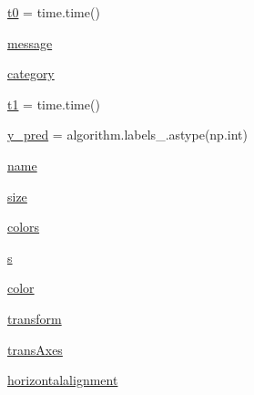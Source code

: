 \begin{DoxyCompactItemize}
\item 
\hyperlink{namespaceStreamClusteringAlgorithms_1_1evoStream_1_1v1_1_1Tests_1_1plot__cluster__comparison2_ac0dd76c5ba016809d5a00a239a231dc4}{t0} = time.\+time()
\item 
\hyperlink{namespaceStreamClusteringAlgorithms_1_1evoStream_1_1v1_1_1Tests_1_1plot__cluster__comparison2_ae7d4af8c5bedcefff2785458eff86e66}{message}
\item 
\hyperlink{namespaceStreamClusteringAlgorithms_1_1evoStream_1_1v1_1_1Tests_1_1plot__cluster__comparison2_a5ada10fda3ccf53faa672704f11e469b}{category}
\item 
\hyperlink{namespaceStreamClusteringAlgorithms_1_1evoStream_1_1v1_1_1Tests_1_1plot__cluster__comparison2_ad9e12b3b114065ccc2d6aadd4938bf27}{t1} = time.\+time()
\item 
\hyperlink{namespaceStreamClusteringAlgorithms_1_1evoStream_1_1v1_1_1Tests_1_1plot__cluster__comparison2_a30abebca0c85ecd6f642a4cb9d3c5b06}{y\+\_\+pred} = algorithm.\+labels\+\_\+.\+astype(np.\+int)
\item 
\hyperlink{namespaceStreamClusteringAlgorithms_1_1evoStream_1_1v1_1_1Tests_1_1plot__cluster__comparison2_a0acf36096f0c66e5018ab3905ef79c79}{name}
\item 
\hyperlink{namespaceStreamClusteringAlgorithms_1_1evoStream_1_1v1_1_1Tests_1_1plot__cluster__comparison2_a2b6c122857964f1f82c1e9a0bfa04c23}{size}
\item 
\hyperlink{namespaceStreamClusteringAlgorithms_1_1evoStream_1_1v1_1_1Tests_1_1plot__cluster__comparison2_af00dd941be19e9e8e08fc1013b8a8a9d}{colors}
\item 
\hyperlink{namespaceStreamClusteringAlgorithms_1_1evoStream_1_1v1_1_1Tests_1_1plot__cluster__comparison2_ad1c582e1821382430409d28491f70153}{s}
\item 
\hyperlink{namespaceStreamClusteringAlgorithms_1_1evoStream_1_1v1_1_1Tests_1_1plot__cluster__comparison2_a42cc4316842f99a0ea1885541c312ea4}{color}
\item 
\hyperlink{namespaceStreamClusteringAlgorithms_1_1evoStream_1_1v1_1_1Tests_1_1plot__cluster__comparison2_a05ad402ba53a2057fda919220f45aac2}{transform}
\item 
\hyperlink{namespaceStreamClusteringAlgorithms_1_1evoStream_1_1v1_1_1Tests_1_1plot__cluster__comparison2_aa2d0ac96d1f1a550150746482afc6906}{trans\+Axes}
\item 
\hyperlink{namespaceStreamClusteringAlgorithms_1_1evoStream_1_1v1_1_1Tests_1_1plot__cluster__comparison2_ab0a179491932f87267669fdeadd48a1e}{horizontalalignment}
\end{DoxyCompactItemize}


